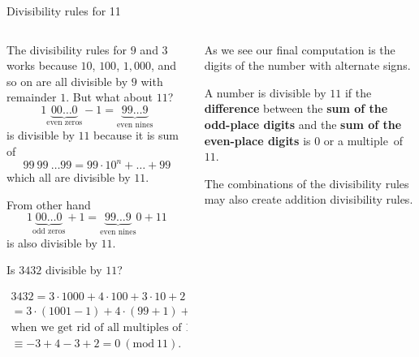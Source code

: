\documentclass[9pt,aspectratio=169]{beamer}
\newcommand{\Mod}[1]{\ (\mathrm{mod}\ #1)}
\begin{document}
\begin{frame}{Divisibility rules for 11}
  \begin{columns}[T]
    \begin{column}{0.5\textwidth}
      The divisibility rules for $9$ and $3$ works because $10$, $100$, $1{,}000$, and so on are all divisible by $9$ with remainder $1$. But what about $11$?
      \[ 1\underbrace{00\ldots 0}_\text{even zeros} - 1 = \underbrace{99 \ldots 9}_\text{even nines} \]
      is divisible by $11$ because it is sum of
      \[ 99\ 99\ \ldots 99 = 99\cdot 10^n + \ldots + 99 \] which all are divisible by $11$.

      From other hand
      \[ 1\underbrace{00\ldots 0}_\text{odd zeros} + 1 = \underbrace{99\ldots 9}_\text{even nines}0 + 11 \]
      is also divisible by $11$.

      \begin{problem}
        Is $3432$ divisible by $11$?
      \end{problem}
      \vspace*{-1em}
      \begin{multline*}
        3432 = 3 \cdot 1000 + 4 \cdot 100 + 3 \cdot 10 + 2 = \\
        = 3 \cdot (1001 - 1) + 4 \cdot (99 + 1) + 3 \cdot (11 - 1) + 2 \equiv \\
        \text{when we get rid of all multiples of 11} \\
        \equiv -3 + 4 - 3 + 2 = 0 \Mod{11}.
      \end{multline*}
    \end{column}
    \begin{column}{0.5\textwidth}
      As we see our final computation is the digits of the number with alternate signs.
      \begin{definition}
        A number is divisible by $11$ if the \textbf{difference} between the \textbf{sum of the odd-place digits} and the \textbf{sum of the even-place digits} is $0$ or a multiple~of~$11$.
      \end{definition}\medskip

      The combinations of the divisibility rules may also create addition divisibility rules. 


\end{column}
\end{columns}
\end{frame}
\end{document}
